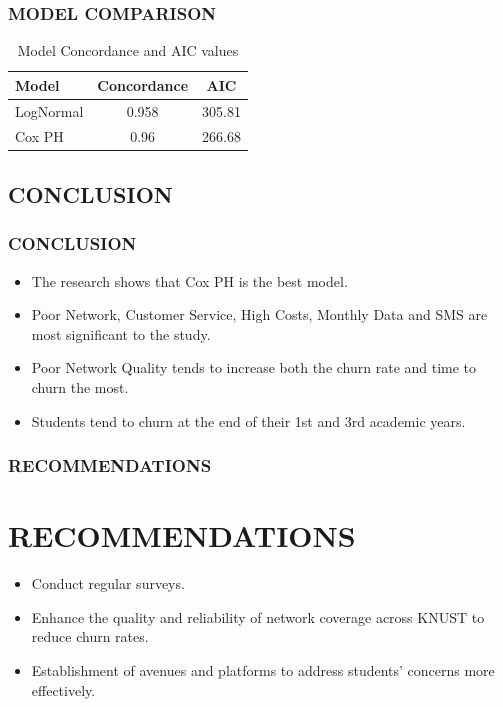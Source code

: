 \documentclass[12pt]{beamer}
\begin{document}
	\begin{frame}
		\frametitle{MODEL COMPARISON}
		\begin{table}[H]
			\centering
			\begin{tabular}{lcc}
				\toprule
				\textbf{Model} & \textbf{Concordance} & \textbf{AIC}\\
				\midrule
				LogNormal& 0.958& 	305.81\\
				Cox PH & 0.96& 	266.68\\
				\bottomrule
			\end{tabular}
			\caption{Model Concordance and AIC values}
			\label{Table 2}
			
		\end{table}
		
	\end{frame}
	
	
	\begin{frame}
 	\section{CONCLUSION}

		\frametitle{CONCLUSION}
		\begin{itemize}
			\item The research shows that Cox PH is the best model.
            \vspace{0.3cm}

           \item Poor Network, Customer Service, High Costs, Monthly Data and SMS are most significant to the study.
           \vspace{0.3cm}
           
			\item Poor Network Quality tends to increase both the churn rate and time to churn the most.
            \vspace{0.3cm}
			\item Students tend to churn at the end of their 1st and 3rd academic years.
		\end{itemize}
	\end{frame}
 
	
	\begin{frame}
		\frametitle{RECOMMENDATIONS}
  \section{RECOMMENDATIONS}
		\begin{itemize}
			\item Conduct regular surveys.
\vspace{0.3cm}

			\item Enhance the quality and reliability of network coverage across KNUST to reduce churn rates.
\vspace{0.3cm}

			\item Establishment of avenues and platforms to address students' concerns more effectively.
    
    \end{itemize}	
 \end{frame}
	
\end{document}
